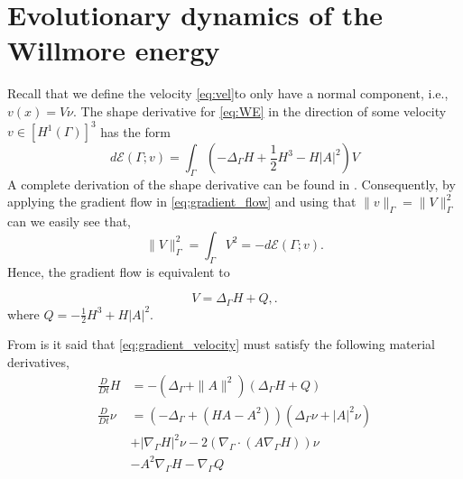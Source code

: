 

\section{Evolutionary dynamics of the Willmore energy}%
\label{sec:evolutionary_pde_s_of_the_willmore_flow}

Recall that we define the velocity \eqref{eq:vel}to only have a normal component, i.e., $v\left( x \right)  = V \nu $.
The shape derivative for \eqref{eq:WE} in the direction of some velocity $v \in \left[ H^{1}\left( \Gamma  \right)  \right]^3   $ has the form \[
d\mathcal{E} \left( \Gamma; v  \right)  = \int_{\Gamma }^{} \left( - \Delta _{\Gamma } H + \frac{1}{2} H^{3} - H \left\lvert A \right\rvert^2  \right) V
\]
A complete derivation of the shape derivative can be found in \cite[Corally 4.7]{dougan2012first}. Consequently, by applying the gradient flow in \eqref{eq:gradient_flow} and using that $\| v \|_{ \Gamma  }^{  }  = \| V \|_{ \Gamma   }^{2  }   $ can
we easily see that,
\[
      \| V \|_{ \Gamma   }^{2  } = \int_{\Gamma }^{} V^2 = -d \mathcal{E} \left( \Gamma ;v \right).
\]
Hence, the gradient flow is equivalent to

\begin{equation}
\label{eq:gradient_velocity}
V  =   \Delta _{\Gamma } H + Q,
.\end{equation}
\[
\]
where $Q  = - \frac{1}{2} H^{3} + H \left\lvert A \right\rvert^2$.

From \cite{kovacs2021convergent,hu2022evolving} is it said that \eqref{eq:gradient_velocity} must satisfy the following material derivatives,
\[
    \begin{split}
\frac{D}{Dt}H & = - \left( \Delta _{\Gamma } + \| A \|_{  }^{ 2 }  \right) \left( \Delta _{\Gamma }H + Q \right) \\
\frac{D}{Dt} \nu
& = \left( -\Delta _{\Gamma } + \left( HA - A^2 \right)  \right) \left( \Delta _{\Gamma } \nu  +  \left\lvert A \right\rvert ^2   \nu    \right)  \\
&  + \left\lvert \nabla _{\Gamma } H \right\rvert ^2   \nu       - 2\left( \nabla _{\Gamma }\cdot \left( A \nabla _{\Gamma } H \right)  \right) \nu  \\
  & -A^2 \nabla _{\Gamma } H  - \nabla _{\Gamma } Q
    \end{split}
\]


